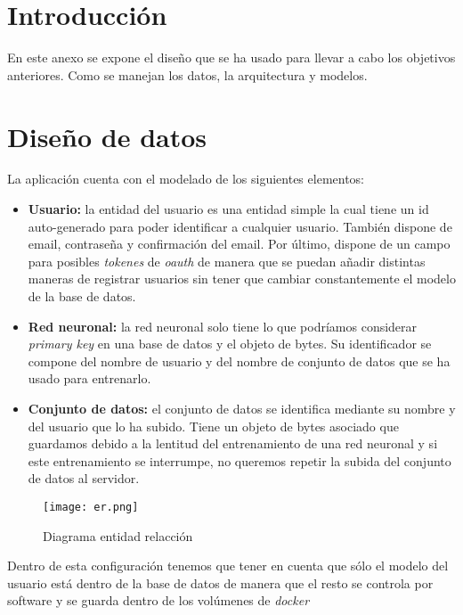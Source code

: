 
\section{Introducción}
En este anexo se expone el diseño que se ha usado para llevar a cabo los objetivos anteriores. Como se manejan los datos, la arquitectura y modelos.

\section{Diseño de datos}
La aplicación cuenta con el modelado de los siguientes elementos:

\begin{itemize}
\item \textbf{Usuario:} la entidad del usuario es una entidad simple la cual tiene un id auto-generado para poder identificar a cualquier usuario. También dispone de email, contraseña y confirmación del email. Por último, dispone de un campo para posibles \emph{tokenes} de \emph{oauth} de manera que se puedan añadir distintas maneras de registrar usuarios sin tener que cambiar constantemente el modelo de la base de datos.

\item \textbf{Red neuronal:} la red neuronal solo tiene lo que podríamos considerar \emph{primary key} en una base de datos y el objeto de bytes. Su identificador se compone del nombre de usuario y del nombre de conjunto de datos que se ha usado para entrenarlo. 

\item \textbf{Conjunto de datos:} el conjunto de datos se identifica mediante su nombre y del usuario que lo ha subido. Tiene un objeto de bytes asociado que guardamos debido a la lentitud del entrenamiento de una red neuronal y si este entrenamiento se interrumpe, no queremos repetir la subida del conjunto de datos al servidor.

\end{itemize}

\begin{figure}
	\centering
	\texttt{[image: er.png]}
	\caption{Diagrama entidad relacción}\label{fig:er.png}
\end{figure}


Dentro de esta configuración tenemos que tener en cuenta que sólo el modelo del usuario está dentro de la base de datos de manera que el resto se controla por software y se guarda dentro de los volúmenes de \emph{docker}



